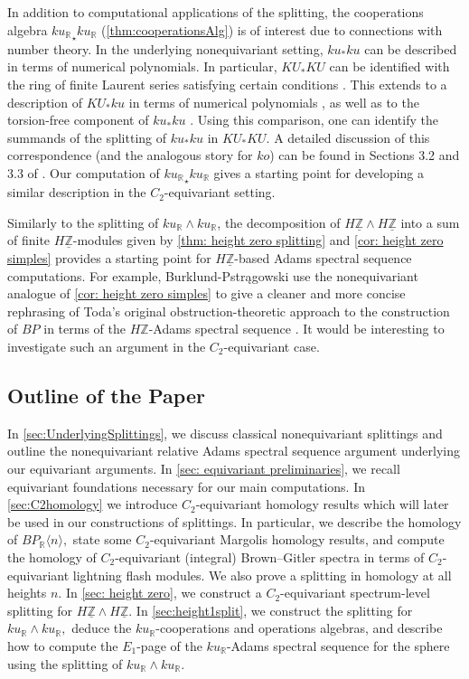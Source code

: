 \documentclass{amsart}
\theoremstyle{plain}
\numberwithin{equation}{section}
\numberwithin{figure}{section}
\newcommand{\mR}{{\mathbb R}}
\newcommand{\mZ}{{\mathbb Z}}
\newcommand{\umZ}{\underline{\mZ}}
\newcommand{\0}{\langle 0 \rangle }
\begin{document}
In addition to computational applications of the splitting, the cooperations algebra ${ku_\mR}_\star ku_\mR$ (\cref{thm:cooperationsAlg}) is of interest due to connections with number theory. In the underlying nonequivariant setting, $ku_{*}ku$ can be described in terms of numerical polynomials. In particular, $KU_{*}KU$ can be identified with the ring of finite Laurent series satisfying certain conditions \cite[Theorem~13.4]{Adams74}. This extends to a description of $KU_{*}ku$ in terms of numerical polynomials \cite[Theorem~17.4]{Adams74}, as well as to the torsion-free component of $ku_*ku$ \cite[p.~358]{Adams74}. Using this comparison, one can identify the summands of the splitting of $ku_{*}ku$ in $KU_{*}KU$.  A detailed discussion of this correspondence (and the analogous story for $ko$) can be found in Sections 3.2 and 3.3 of \cite{BOSS19}. Our computation of ${ku_\mR}_\star ku_\mR$ gives a starting point for developing a similar description in the $C_2$-equivariant setting. 

Similarly to the splitting of $ku_\mR \wedge ku_\mR$, the decomposition of $H \umZ \wedge H \umZ$ into a sum of finite $H \umZ$-modules given by \cref{thm: height zero splitting} and \cref{cor: height zero simples} provides a starting point for $H\umZ$-based Adams spectral sequence computations. For example, Burklund-Pstr\k{a}gowski use the nonequivariant analogue of \cref{cor: height zero simples} to give a cleaner and more concise rephrasing of Toda's original obstruction-theoretic approach to the construction of $BP$ in terms of the $H\mZ$-Adams spectral sequence \cite[Theorem~4.41]{burklund2023quiversadamsspectralsequence}. It would be interesting to investigate such an argument in the $C_2$-equivariant case. 

\subsection{Outline of the Paper}

In \cref{sec:UnderlyingSplittings}, we discuss classical nonequivariant splittings and outline the nonequivariant relative Adams spectral sequence argument underlying our equivariant arguments. In \cref{sec: equivariant preliminaries}, we recall equivariant foundations necessary for our main computations. In \cref{sec:C2homology} we introduce $C_2$-equivariant homology results which will later be used in our constructions of splittings. In particular, we describe the homology of $BP_\mR \langle n \rangle,$ state some $C_2$-equivariant Margolis homology results, and compute the homology of $C_2$-equivariant (integral) Brown--Gitler spectra in terms of $C_2$-equivariant lightning flash modules. We also prove a splitting in homology at all heights $n.$ In \cref{sec: height zero}, we construct a $C_2$-equivariant spectrum-level splitting for $H \umZ \wedge H \umZ.$ In \cref{sec:height1split}, we construct the splitting for $ku_\mR \wedge ku_\mR,$ deduce the $ku_\mR$-cooperations and operations algebras, and describe how to compute the $E_1$-page of the $ku_\mR$-Adams spectral sequence for the sphere using the splitting of $ku_\mR \wedge ku_\mR$. 
\end{document}
